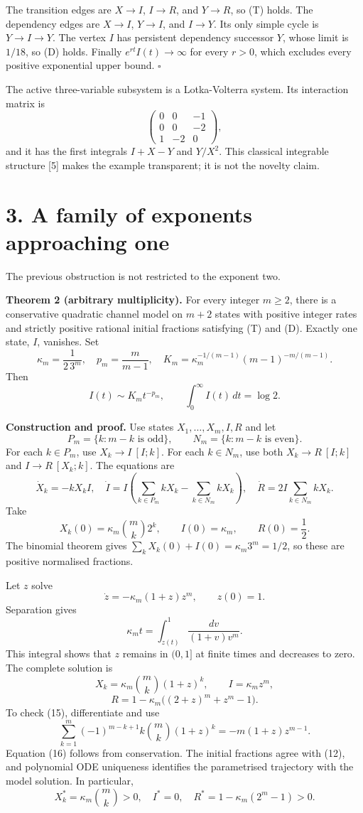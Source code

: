 \documentclass[
  11pt,
  a4paper,
]{scrartcl}
\begin{document}
The transition edges are \(X\to I\), \(I\to R\), and \(Y\to R\), so (T)
holds. The dependency edges are \(X\to I\), \(Y\to I\), and \(I\to Y\).
Its only simple cycle is \(Y\to I\to Y\). The vertex \(I\) has
persistent dependency successor \(Y\), whose limit is \(1/18\), so (D)
holds. Finally \(e^{rt}I(t)\to\infty\) for every \(r>0\), which excludes
every positive exponential upper bound. \(\square\)

The active three-variable subsystem is a Lotka-Volterra system. Its
interaction matrix is \[
\begin{pmatrix}0&0&-1\\0&0&-2\\1&-2&0\end{pmatrix},
\] and it has the first integrals \(I+X-Y\) and \(Y/X^2\). This
classical integrable structure {[}5{]} makes the example transparent; it
is not the novelty claim.

\section{3. A family of exponents approaching
one}\label{a-family-of-exponents-approaching-one}

The previous obstruction is not restricted to the exponent two.

\textbf{Theorem 2 (arbitrary multiplicity).} For every integer
\(m\ge2\), there is a conservative quadratic channel model on \(m+2\)
states with positive integer rates and strictly positive rational
initial fractions satisfying (T) and (D). Exactly one state, \(I\),
vanishes. Set \[
\kappa_m=\frac1{2\,3^m},\quad
p_m=\frac m{m-1},\quad
K_m=\kappa_m^{-1/(m-1)}(m-1)^{-m/(m-1)}.
\tag{9}
\] Then \[
I(t)\sim K_m t^{-p_m},\qquad
\int_0^\infty I(t)\,dt=\log2.
\tag{10}
\]

\textbf{Construction and proof.} Use states \(X_1,\ldots,X_m,I,R\) and
let \[
P_m=\{k:m-k\text{ is odd}\},\qquad
N_m=\{k:m-k\text{ is even}\}.
\] For each \(k\in P_m\), use \(X_k\to I\ [I;k]\). For each
\(k\in N_m\), use both \(X_k\to R\ [I;k]\) and \(I\to R\ [X_k;k]\). The
equations are \[
\dot X_k=-kX_kI,
\quad
\dot I=I\left(\sum_{k\in P_m}kX_k-\sum_{k\in N_m}kX_k\right),
\quad
\dot R=2I\sum_{k\in N_m}kX_k.
\tag{11}
\] Take \[
X_k(0)=\kappa_m\binom mk2^k,\qquad I(0)=\kappa_m,\qquad R(0)=\frac12.
\tag{12}
\] The binomial theorem gives \(\sum_kX_k(0)+I(0)=\kappa_m3^m=1/2\), so
these are positive normalised fractions.

Let \(z\) solve \[
\dot z=-\kappa_m(1+z)z^m,\qquad z(0)=1.
\tag{13}
\] Separation gives \[
\kappa_m t=\int_{z(t)}^1\frac{dv}{(1+v)v^m}.
\tag{14}
\] This integral shows that \(z\) remains in \((0,1]\) at finite times
and decreases to zero. The complete solution is \[
X_k=\kappa_m\binom mk(1+z)^k,\qquad I=\kappa_m z^m,
\tag{15}
\] \[
R=1-\kappa_m\bigl((2+z)^m+z^m-1\bigr).
\tag{16}
\] To check (15), differentiate and use \[
\sum_{k=1}^m(-1)^{m-k+1}k\binom mk(1+z)^k
=-m(1+z)z^{m-1}.
\tag{17}
\] Equation (16) follows from conservation. The initial fractions agree
with (12), and polynomial ODE uniqueness identifies the parametrised
trajectory with the model solution. In particular, \[
X_k^*=\kappa_m\binom mk>0,\quad I^*=0,\quad
R^*=1-\kappa_m(2^m-1)>0.
\tag{18}
\]
\end{document}

